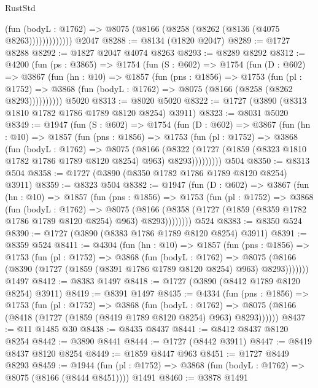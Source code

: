 \begin{lexlean}{RustStd}
\begin{coremodule}
                  (fun (bodyL : @1762) =>
                  @8075 (@8166 (@8258 (@8262 (@8136 (@4075 @8263)))))))))))))
    @2047
@8288 := @8134 (@1820 @2047)
@8289 := @1727 @8288
@8292 := @1827 @2047 @4074 @8263
@8293 := @8289 @8292
@8312 := @4200
    (fun (ps : @3865) =>
    @1754
      (fun (S : @602) =>
      @1754
        (fun (D : @602) =>
        @3867
          (fun (hn : @10) =>
          @1857
            (fun (pns : @1856) =>
            @1753
              (fun (pl : @1752) =>
              @3868 (fun (bodyL : @1762) => @8075 (@8166 (@8258 (@8262 @8293))))))))))
    @5020
@8313 := @8020 @5020
@8322 := @1727 (@3890 (@8313 @1810 @1782 @1786 @1789 @8120 @8254) @3911)
@8323 := @8031 @5020
@8349 := @1947
    (fun (S : @602) =>
    @1754
      (fun (D : @602) =>
      @3867
        (fun (hn : @10) =>
        @1857
          (fun (pns : @1856) =>
          @1753
            (fun (pl : @1752) =>
            @3868
              (fun (bodyL : @1762) =>
              @8075
                (@8166
                  (@8322
                    (@1727 (@1859 (@8323 @1810 @1782 @1786 @1789 @8120 @8254) @963) @8293)))))))))
    @504
@8350 := @8313 @504
@8358 := @1727 (@3890 (@8350 @1782 @1786 @1789 @8120 @8254) @3911)
@8359 := @8323 @504
@8382 := @1947
    (fun (D : @602) =>
    @3867
      (fun (hn : @10) =>
      @1857
        (fun (pns : @1856) =>
        @1753
          (fun (pl : @1752) =>
          @3868
            (fun (bodyL : @1762) =>
            @8075
              (@8166 (@8358 (@1727 (@1859 (@8359 @1782 @1786 @1789 @8120 @8254) @963) @8293))))))))
    @524
@8383 := @8350 @524
@8390 := @1727 (@3890 (@8383 @1786 @1789 @8120 @8254) @3911)
@8391 := @8359 @524
@8411 := @4304
    (fun (hn : @10) =>
    @1857
      (fun (pns : @1856) =>
      @1753
        (fun (pl : @1752) =>
        @3868
          (fun (bodyL : @1762) =>
          @8075 (@8166 (@8390 (@1727 (@1859 (@8391 @1786 @1789 @8120 @8254) @963) @8293)))))))
    @1497
@8412 := @8383 @1497
@8418 := @1727 (@3890 (@8412 @1789 @8120 @8254) @3911)
@8419 := @8391 @1497
@8435 := @4334
    (fun (pns : @1856) =>
    @1753
      (fun (pl : @1752) =>
      @3868
        (fun (bodyL : @1762) =>
        @8075 (@8166 (@8418 (@1727 (@1859 (@8419 @1789 @8120 @8254) @963) @8293))))))
@8437 := @11 @1485 @30
@8438 := @8435 @8437
@8441 := @8412 @8437 @8120 @8254
@8442 := @3890 @8441
@8444 := @1727 (@8442 @3911)
@8447 := @8419 @8437 @8120 @8254
@8449 := @1859 @8447 @963
@8451 := @1727 @8449 @8293
@8459 := @1944
    (fun (pl : @1752) => @3868 (fun (bodyL : @1762) => @8075 (@8166 (@8444 @8451))))
    @1491
@8460 := @3878 @1491

\end{coremodule}
\end{lexlean}
